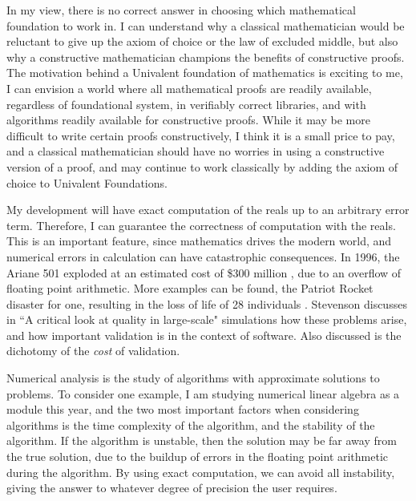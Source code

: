 \documentclass[ProjectReport]{subfiles}
\begin{document}
In my view, there is no correct answer in choosing which mathematical foundation to work in. I can understand why a classical mathematician would be reluctant to give up the axiom of choice or the law of excluded middle, but also why a constructive mathematician champions the benefits of constructive proofs. The motivation behind a Univalent foundation of mathematics is exciting to me, I can envision a world where all mathematical proofs are readily available, regardless of foundational system, in verifiably correct libraries, and with algorithms readily available for constructive proofs. While it may be more difficult to write certain proofs constructively, I think it is a small price to pay, and a classical mathematician should have no worries in using a constructive version of a proof, and may continue to work classically by adding the axiom of choice to Univalent Foundations.


My development will have exact computation of the reals up to an arbitrary error term. Therefore, I can guarantee the correctness of computation with the reals. This is an important feature, since mathematics drives the modern world, and numerical errors in calculation can have catastrophic consequences. In 1996, the Ariane 501 exploded at an estimated cost of \$300 million \cite{ARIANE1}, due to an overflow of floating point arithmetic. More examples can be found, the Patriot Rocket disaster for one, resulting in the loss of life of 28 individuals \cite{office_patriot_nodate}. Stevenson discusses in ``A critical look at quality in large-scale" simulations \cite{QualityInSimulation} how these problems arise, and how important validation is in the context of software. Also discussed is the dichotomy of the \textit{cost} of validation. 

Numerical analysis is the study of algorithms with approximate solutions to problems. To consider one example, I am studying numerical linear algebra as a module this year, and the two most important factors when considering algorithms is the time complexity of the algorithm, and the stability of the algorithm. If the algorithm is unstable, then the solution may be far away from the true solution, due to the buildup of errors in the floating point arithmetic during the algorithm. By using exact computation, we can avoid all instability, giving the answer to whatever degree of precision the user requires.
\end{document}
